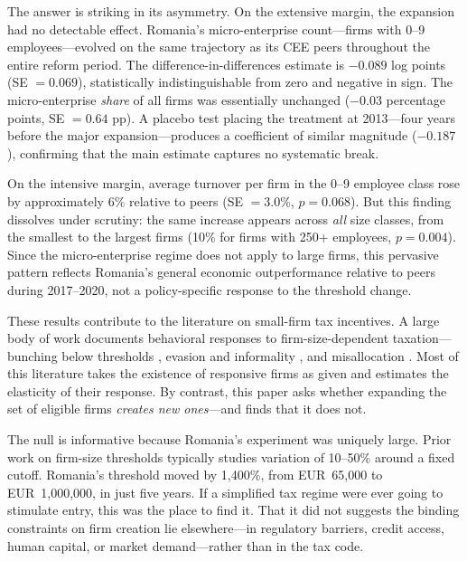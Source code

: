 \documentclass[12pt]{article}
\begin{document}
The answer is striking in its asymmetry. On the extensive margin, the expansion had no detectable effect. Romania's micro-enterprise count---firms with 0--9 employees---evolved on the same trajectory as its CEE peers throughout the entire reform period. The difference-in-differences estimate is $-0.089$ log points (SE $= 0.069$), statistically indistinguishable from zero and negative in sign. The micro-enterprise \textit{share} of all firms was essentially unchanged ($-0.03$ percentage points, SE $= 0.64$ pp). A placebo test placing the treatment at 2013---four years before the major expansion---produces a coefficient of similar magnitude ($-0.187$), confirming that the main estimate captures no systematic break.

On the intensive margin, average turnover per firm in the 0--9 employee class rose by approximately 6\% relative to peers (SE $= 3.0$\%, $p = 0.068$). But this finding dissolves under scrutiny: the same increase appears across \textit{all} size classes, from the smallest to the largest firms (10\% for firms with 250+ employees, $p = 0.004$). Since the micro-enterprise regime does not apply to large firms, this pervasive pattern reflects Romania's general economic outperformance relative to peers during 2017--2020, not a policy-specific response to the threshold change.

These results contribute to the literature on small-firm tax incentives. A large body of work documents behavioral responses to firm-size-dependent taxation---bunching below thresholds \citep{saez2010bunching, kleven2013using, best2015production}, evasion and informality \citep{gorodnichenko2009myth, bachas2019size}, and misallocation \citep{guner2008macroeconomic, garicano2016firm}. Most of this literature takes the existence of responsive firms as given and estimates the elasticity of their response. By contrast, this paper asks whether expanding the set of eligible firms \textit{creates new ones}---and finds that it does not.

The null is informative because Romania's experiment was uniquely large. Prior work on firm-size thresholds typically studies variation of 10--50\% around a fixed cutoff. Romania's threshold moved by 1,400\%, from EUR~65,000 to EUR~1,000,000, in just five years. If a simplified tax regime were ever going to stimulate entry, this was the place to find it. That it did not suggests the binding constraints on firm creation lie elsewhere---in regulatory barriers, credit access, human capital, or market demand---rather than in the tax code.
\end{document}
